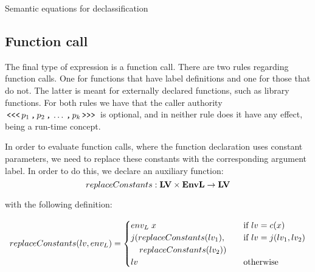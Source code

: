 \begin{table}[H]
\begin{semanticequations}
 \seSpace
\end{semanticequations}
\caption{Semantic equations for declassification}
\label{cstr:declassification}
\end{table}

\subsection{Function call}
The final type of expression is a function call.
There are two rules regarding function calls.
One for functions that have label definitions and one for those that do not.
The latter is meant for externally declared functions, such as library functions.
For both rules we have that the caller authority $\, \texttt{<{}<{}<} \, p_1 \, \texttt{,} \, p_2 \, \texttt{,} \, \dots \, \texttt{,} \, p_k \, \texttt{>{}>{}>} \,$ is optional, and in neither rule does it have any effect, being a run-time concept.

In order to evaluate function calls, where the function declaration uses constant parameters, we need to replace these constants with the corresponding argument label.
In order to do this, we declare an auxiliary function:
\[ replaceConstants : \mathbf{LV} \times \mathbf{EnvL} \rightarrow \mathbf{LV} \]

with the following definition:

\[replaceConstants(lv, {env_L}) = \begin{cases}
  {env_L} \; x & \quad \text{if } lv = c(x) \\
  j(replaceConstants(lv_1), & \quad \text{if } lv = j(lv_1, lv_2) \\
  \quad replaceConstants(lv_2)) & \\
  lv & \quad \text{otherwise}
\end{cases} \]

